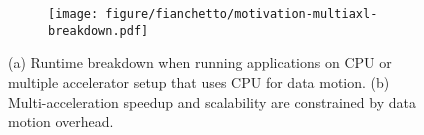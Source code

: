 %
\begin{figure}[ht!]
    \begin{subfigure}[b]{0.9\columnwidth}
    \texttt{[image: figure/fianchetto/motivation-multiaxl-breakdown.pdf]}
    \caption{}
    \label{fig:motivation:bar:breakdown}
    \end{subfigure}
    
    \begin{subfigure}[b]{0.9\columnwidth}
    \end{subfigure}
    \caption{(a) Runtime breakdown when running applications on CPU or multiple accelerator setup that uses CPU for data motion. (b) Multi-acceleration speedup and scalability are constrained by data motion overhead.}
    \label{fig:motivation:bar}
\end{figure}


